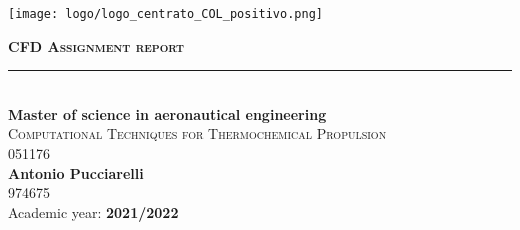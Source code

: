 
\begin{titlepage}
    \begin{center}
     
        \texttt{[image: logo/logo\_centrato\_COL\_positivo.png]}
        
        \vspace{1cm}
        
        \Huge{\bf \textsc{CFD Assignment report}} \\[-15pt]
        \rule{\textwidth}{1pt} \\[0.5cm]
        
        \Large{\textbf{Master of science in aeronautical engineering}}\\[0.5cm]
        
        \Large{\textsc{Computational Techniques for Thermochemical Propulsion \\ 051176}} \\[2cm] 
        
        \textbf{Antonio Pucciarelli} \\ 974675 \\[2cm]

        \large{Academic year: \textbf{2021/2022}} \\[-0.25cm]
        
    \end{center}
\end{titlepage}
